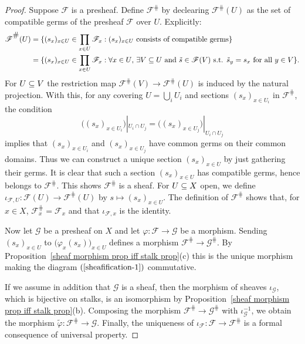 \begin{proof}
Suppose $\mathscr{F}$ is a presheaf. Define $\mathscr{F}^{\hash}$ by declearing $\mathscr{F}^{\hash}(U)$ as the set of compatible germs of the presheaf $\mathscr{F}$ over $U$. Explicitly:
\begin{align*}
\mathscr{F}^{\hash}(U)&=\{(s_x)_{x\in U}\in\prod_{x\in U}\mathscr{F}_x:\text{$(s_x)_{x\in U}$ consists of compatible germs}\}\\
&=\{(s_x)_{x\in U}\in\prod_{x\in U}\mathscr{F}_x:\text{$\forall x\in U$, $\exists V\sub U$ and $\tilde{s}\in\mathscr{F}(V)$ s.t. $\tilde{s}_{y}=s_x$ for all $y\in V$}\}.
\end{align*}
For $U\subseteq V$ the restriction map $\mathscr{F}^{\hash}(V)\to\mathscr{F}^{\hash}(U)$ is induced by the natural projection. With this, for any covering $U=\bigcup_iU_i$ and sections $(s_x)_{x\in U_i}$ in $\mathscr{F}^{\hash}$, the condition
\[\big((s_x)_{x\in U_i}\big)|_{U_i\cap U_j}=\big((s_x)_{x\in U_j}\big)|_{U_i\cap U_j}\]
implies that $(s_x)_{x\in U_i}$ and $(s_x)_{x\in U_j}$ have common germs on their common domains. Thus we can construct a unique section $(s_x)_{x\in U}$ by just gathering their germs. It is clear that such a section $(s_x)_{x\in U}$ has compatible germs, hence belongs to $\mathscr{F}^{\hash}$. This shows $\mathscr{F}^{\hash}$ is a sheaf. For $U\subseteq X$ open, we define $\iota_{\mathscr{F},U}:\mathscr{F}(U)\to\mathscr{F}^{\hash}(U)$ by $s\mapsto(s_x)_{x\in U}$. The definition of $\mathscr{F}^{\hash}$ shows that, for $x\in X$, $\mathscr{F}^{\hash}_x=\mathscr{F}_x$ and that $\iota_{\mathscr{F},x}$ is the identity.\par
Now let $\mathscr{G}$ be a presheaf on $X$ and let $\varphi:\mathscr{F}\to\mathscr{G}$ be a morphism. Sending $(s_x)_{x\in U}$ to $\big(\varphi_x(s_x)\big)_{x\in U}$ defines a morphism $\mathscr{F}^{\hash}\to\mathscr{G}^{\hash}$. By Proposition~\ref{sheaf morphism prop iff stalk prop}(c) this is the unique morphism making the diagram $(\ref{sheafification-1})$ commutative.\par
If we assume in addition that $\mathscr{G}$ is a sheaf, then the morphism of sheaves $\iota_{\mathscr{G}}$, which is bijective on stalks, is an isomorphism by Proposition~\ref{sheaf morphism prop iff stalk prop}(b). Composing the morphism $\mathscr{F}^{\hash}\to\mathscr{G}^{\hash}$ with $\iota_{\mathscr{G}}^{-1}$, we obtain the morphism $\tilde{\varphi}:\mathscr{F}^{\hash}\to\mathscr{G}$. Finally, the uniqueness of $\iota_{\mathscr{F}}:\mathscr{F}\to\mathscr{F}^{\hash}$ is a formal consequence of universal property.
\end{proof}
